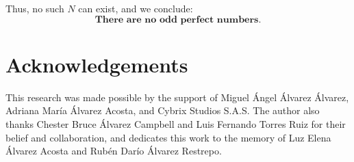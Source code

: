 \documentclass[12pt]{article}
\begin{document}
Thus, no such \( N \) can exist, and we conclude:
\[
\textbf{There are no odd perfect numbers}.
\]

\section*{Acknowledgements}
This research was made possible by the support of Miguel Ángel Álvarez Álvarez, Adriana María Álvarez Acosta, and Cybrix Studios S.A.S. The author also thanks Chester Bruce Álvarez Campbell and Luis Fernando Torres Ruiz for their belief and collaboration, and dedicates this work to the memory of Luz Elena Álvarez Acosta and Rubén Darío Álvarez Restrepo.
\end{document}
